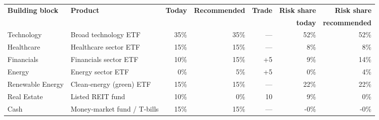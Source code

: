 \begin{tabular}{@{}llrrrrr@{}}
\toprule
\textbf{Building block} & \textbf{Product} & \textbf{Today} & \textbf{Recommended} & \textbf{Trade} & \textbf{Risk share} & \textbf{Risk share} \\
 & & & & & \textbf{today} & \textbf{recommended} \\
\midrule
Technology & Broad technology ETF & 35\% & 35\% & --- & 52\% & 52\% \\
Healthcare & Healthcare sector ETF & 15\% & 15\% & --- & 8\% & 8\% \\
Financials & Financials sector ETF & 10\% & 15\% & +5 & 9\% & 14\% \\
Energy & Energy sector ETF & 0\% & 5\% & +5 & 0\% & 4\% \\
Renewable Energy & Clean-energy (green) ETF & 15\% & 15\% & --- & 22\% & 22\% \\
Real Estate & Listed REIT fund & 10\% & 0\% & \textminus{}10 & 9\% & 0\% \\
Cash & Money-market fund / T-bills & 15\% & 15\% & --- & -0\% & -0\% \\
\bottomrule
\end{tabular}